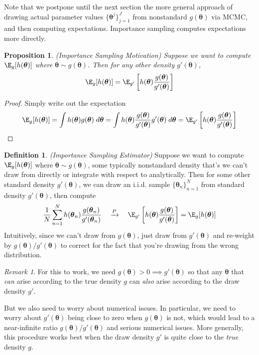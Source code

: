 \documentclass[12pt]{article}
\theoremstyle{plain}
\newtheorem{prop}[thm]{Proposition}
\theoremstyle{definition}
\newtheorem{defn}[thm]{Definition}
\theoremstyle{remark}
\newtheorem*{rmk}{Remark}
\newcommand{\bstheta}{\boldsymbol{\theta}}
\newcommand{\pto}{\xrightarrow{P}}
\newcommand{\sumnN}{\sum^N_{n=1}}
\begin{document}
Note that we postpone until the next section the more general approach
of drawing actual parameter values $\{\bstheta^j\}_{j=1}^J$ from
nonstandard $g(\bstheta)$ via MCMC, and then computing expectations.
Importance sampling computes expectations more directly.

\begin{prop}\emph{(Importance Sampling Motivation)}
Suppose we want to compute $\E_g[h(\bstheta)]$ where $\bstheta\sim g(\bstheta)$.
Then for any other density $g'(\bstheta)$,
\begin{align*}
  \E_g[h(\bstheta)]
  =
  \E_{g'}\left[
    h(\bstheta)
    \frac{g(\bstheta)}{g'(\bstheta)}
  \right]
\end{align*}
\end{prop}
\begin{proof}
Simply write out the expectation
\begin{align*}
  \E_g[h(\bstheta)]
  =
  \int
  h(\bstheta)g(\bstheta)
  \; d\bstheta
  =
  \int
  h(\bstheta)
  \frac{g(\bstheta)}{g'(\bstheta)}
  g'(\bstheta)
  \; d\bstheta
  =
  \E_{g'}\left[
    h(\bstheta)
    \frac{g(\bstheta)}{g'(\bstheta)}
  \right]
\end{align*}
\end{proof}


\begin{defn}\emph{(Importance Sampling Estimator)}
Suppose we want to compute $\E_g[h(\bstheta)]$ where $\bstheta\sim g(\bstheta)$,
some typically nonstandard density that's we can't draw from directly or
integrate with respect to analytically.
Then for some other standard density $g'(\bstheta)$, we can draw an
i.i.d.  sample $\{\bstheta_n\}_{n=1}^N$ from standard density
$g'(\bstheta)$, then compute
\begin{align*}
  \frac{1}{N}\sumnN
  h(\bstheta_n)
  \frac{g(\bstheta_n)}{g'(\bstheta_n)}
  \quad\pto\quad
  \E_{g'}\left[
    h(\bstheta)
    \frac{g(\bstheta)}{g'(\bstheta)}
  \right]
  =
  \E_g[h(\bstheta)]
\end{align*}
Intuitively, since we can't draw from $g(\bstheta)$, just draw from
$g'(\bstheta)$ and re-weight by $g(\bstheta)/g'(\bstheta)$ to correct
for the fact that you're drawing from the wrong distribution.
\end{defn}
\begin{rmk}
For this to work, we need $g(\bstheta)>0 \implies g'(\bstheta)$ so that
any $\bstheta$ that \emph{can} arise according to the true density $g$
can \emph{also} arise according to the draw density $g'$.

But we also need to worry about numerical issues. In particular, we need
to worry about $g'(\bstheta)$ being close to zero when $g(\bstheta)$ is
not, which would lead to a near-infinite ratio
$g(\bstheta)/g'(\bstheta)$ and serious numerical issues.
More generally, this procedure works best when the draw density
$g'$ is quite close to the \emph{true} density $g$.
\end{rmk}
\end{document}
